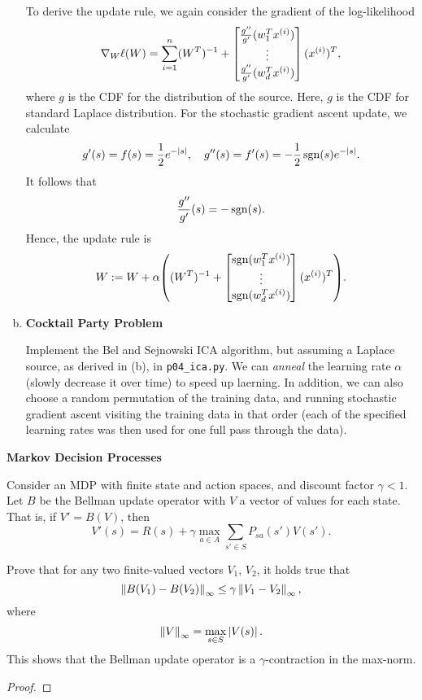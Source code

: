 \documentclass[12pt,letterpaper,boxed]{hmcpset}
\begin{document}
\begin{solution}
\begin{enumerate}[(a)]
    To derive the update rule, we again consider the gradient of the log-likelihood 
    \[
    \nabla_W \ell(W) = \sum_{i=1}^n (W^{T})^{-1} + \begin{bmatrix}
      \frac{g''}{g'} (w_1^T \xx) \\
      \vdots \\
      \frac{g''}{g'} (w_d^T \xx)
    \end{bmatrix}
    (\xx)^T,
    \]
    where $g$ is the CDF for the distribution of the source. Here, $g$ is the CDF for standard Laplace distribution. For the stochastic gradient ascent update, we calculate
    \[
    g'(s) = f(s) = \frac{1}{2} e^{-\left\lvert s\right\rvert}, \quad 
    g''(s) = f'(s) = - \frac{1}{2} \operatorname{sgn}(s) e^{- \left\lvert s\right\rvert}.
    \]
    It follows that
    \[
    \frac{g''}{g'}(s) = - \operatorname{sgn}(s).
    \]
    Hence, the update rule is
    \[
    W := W + \alpha \qty( (W^T)^{-1} + 
      \begin{bmatrix}
        \sgn(w_1^T \xx) \\
        \vdots \\
        \sgn(w_d^T \xx)
      \end{bmatrix}
      (\xx)^T
    ).
    \]

    \item \textbf{Cocktail Party Problem}
    
    Implement the Bel and Sejnowski ICA algorithm, but assuming a Laplace source, as derived in (b), in \verb|p04_ica.py|. We can \emph{anneal} the learning rate $\alpha$ (slowly decrease it over time) to speed up laerning. In addition, we can also choose a random permutation of the training data, and running stochastic gradient ascent visiting the training data in that order (each of the specified learning rates was then used for one full pass through the data).
  \end{enumerate}
\end{solution}

\newpage
\begin{problem}[Problem 5]
  \textbf{Markov Decision Processes}

  Consider an MDP with finite state and action spaces, and discount factor $\gamma < 1$. Let $B$ be the Bellman update operator with $V$ a vector of values for each state. That is, if $V' = B(V)$, then
  \[
  V'(s) = R(s) + \gamma \max_{a \in A} \sum_{s' \in S} P_{sa}(s') V(s').
  \]
\end{problem}
\begin{solution}
  \begin{enumerate}[(a)]
    Prove that for any two finite-valued vectors $V_1$, $V_2$, it holds true that
    \[
    \left\lVert B(V_1) - B(V_2)\right\rVert_{\infty} \leq \gamma \left\lVert V_1 - V_2\right\rVert_{\infty},
    \]
    where 
    \[
    \left\lVert V\right\rVert_{\infty} = \max_{s \in S} \left\lvert V(s)\right\rvert.
    \]
    This shows that the Bellman update operator is a $\gamma$-contraction in the max-norm.
    \begin{proof}
      
    \end{proof}
  \end{enumerate}
\end{solution}
\end{document}
